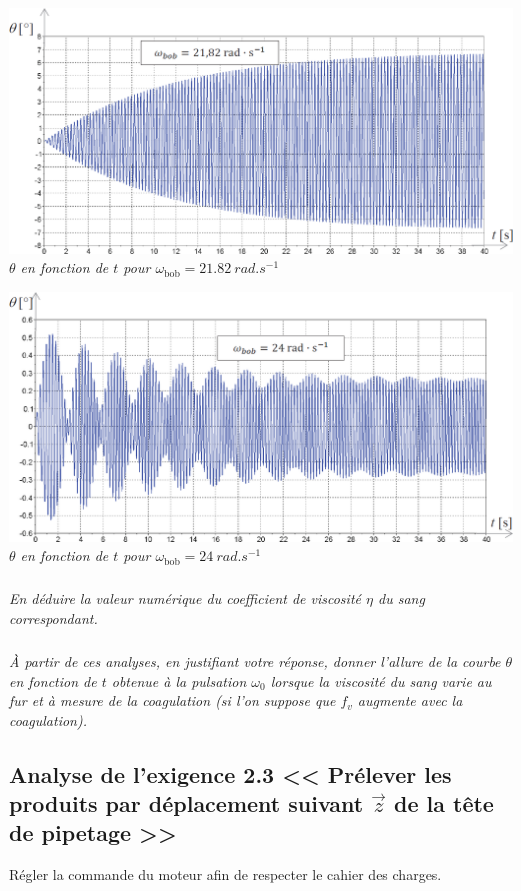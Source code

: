 \documentclass[10pt,fleqn]{article} %
\begin{document}
\begin{minipage}[c]{.48\linewidth}
\begin{center}
\includegraphics[width=\linewidth]{images/ccp_08}
\textit{$\theta$ en fonction de $t$  pour $\omega_{\text{bob}}= \SI{21,82}{rad.s^{-1}}$}
\end{center}

\begin{center}
\includegraphics[width=\linewidth]{images/ccp_09}
\textit{$\theta$ en fonction de $t$  pour $\omega_{\text{bob}}= \SI{24}{rad.s^{-1}}$}
\end{center}

\end{minipage} 


\subparagraph{}\textit{En déduire la valeur numérique du coefficient de viscosité  $\eta$ du sang correspondant.}

\subparagraph{}\textit{À partir de ces analyses, en justifiant votre réponse, donner l’allure de la courbe $\theta$ en fonction de $t$ obtenue à la pulsation $\omega_0$ lorsque la viscosité du sang varie au fur et à mesure de la coagulation (si l’on suppose que $f_v$ augmente avec la coagulation).}

\subsection{Analyse de l’exigence 2.3 << Prélever les produits par déplacement suivant  $\vec{z}$ de la tête de pipetage >>}%
\begin{obj}
Régler la commande du moteur afin de respecter le cahier des charges.
\end{obj}
\end{document}

